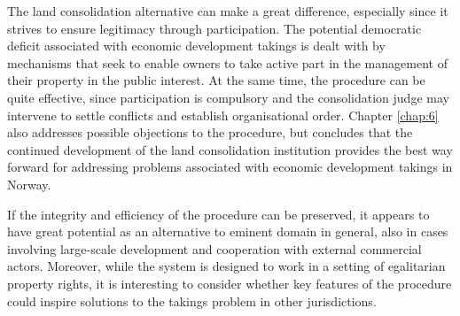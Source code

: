 
The land consolidation alternative can make a great difference, especially since it strives to ensure legitimacy through participation. The potential democratic deficit associated with economic development takings  is dealt with by mechanisms that seek to enable owners to take active part in the management of their property in the public interest. At the same time, the procedure can be quite effective, since participation is compulsory and the consolidation judge may intervene to settle conflicts and establish organisational order. Chapter \ref{chap:6} also addresses possible objections to the procedure, but concludes that the continued development of the land consolidation institution provides the best way forward for addressing problems associated with economic development takings in Norway.


If the integrity and efficiency of the procedure can be preserved, it appears to have great potential as an alternative to eminent domain in general, also in cases involving large-scale development and cooperation with external commercial actors. Moreover, while the system is designed to work in a setting of egalitarian property rights, it is interesting to consider whether key features of the procedure could inspire solutions to the takings problem in other jurisdictions. %

